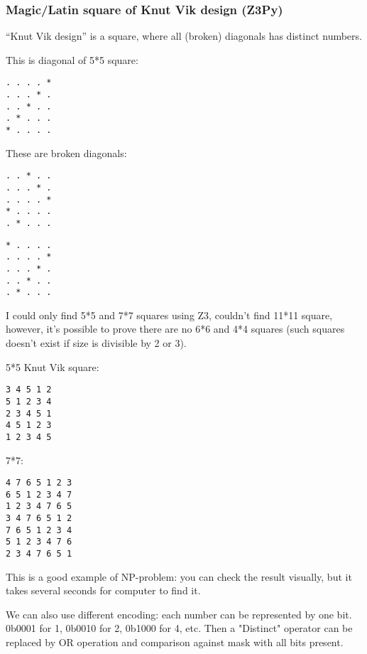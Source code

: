 \subsubsection{Magic/Latin square of Knut Vik design (Z3Py)}

``Knut Vik design'' is a square, where all (broken) diagonals has distinct numbers.

This is diagonal of 5*5 square:

\begin{lstlisting}
. . . . *
. . . * .
. . * . .
. * . . .
* . . . .
\end{lstlisting}

These are broken diagonals:

\begin{lstlisting}
. . * . .
. . . * .
. . . . *
* . . . .
. * . . .
\end{lstlisting}

\begin{lstlisting}
* . . . .
. . . . *
. . . * .
. . * . .
. * . . .
\end{lstlisting}

I could only find 5*5 and 7*7 squares using Z3, couldn't find 11*11 square, however, it's possible to prove there are no 6*6 and 4*4 squares (such squares doesn't exist if size is divisible by 2 or 3).



5*5 Knut Vik square:

\begin{lstlisting}
3 4 5 1 2
5 1 2 3 4
2 3 4 5 1
4 5 1 2 3
1 2 3 4 5
\end{lstlisting}

7*7:

\begin{lstlisting}
4 7 6 5 1 2 3
6 5 1 2 3 4 7
1 2 3 4 7 6 5
3 4 7 6 5 1 2
7 6 5 1 2 3 4
5 1 2 3 4 7 6
2 3 4 7 6 5 1
\end{lstlisting}

This is a good example of NP-problem: you can check the result visually, but it takes several seconds for computer to find it.

We can also use different encoding: each number can be represented by one bit. 0b0001 for 1, 0b0010 for 2, 0b1000 for 4, etc.
Then a "Distinct" operator can be replaced by OR operation and comparison against mask with all bits present.



